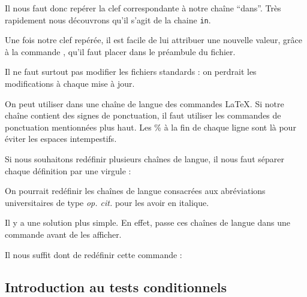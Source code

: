     Il nous faut donc repérer la clef correspondante à notre chaîne \enquote{dans}. Très rapidement nous découvrons qu'il s'agit de la chaine \verb|in|.
    
    Une fois  notre clef repérée, il est facile de lui attribuer une nouvelle valeur, grâce à la commande , qu'il faut placer dans le préambule du fichier.
    
    \begin{attention}
    Il ne faut surtout pas modifier les fichiers standards : on perdrait les modifications à chaque mise à jour.
    \end{attention}
    
    \begin{latexcode}
    \end{latexcode}

    
    On peut utiliser dans une chaîne de langue des commandes \LaTeX. Si notre chaîne contient des signes de ponctuation, il faut utiliser les commandes de ponctuation mentionnées plus haut. Les \% à la fin de chaque ligne sont là pour éviter les espaces intempestifs.
    
    Si nous souhaitons redéfinir plusieurs chaînes de langue, il nous faut séparer chaque définition par une virgule :
    
    \begin{latexcode}
    \end{latexcode}


\begin{plusloins}
On pourrait redéfinir les chaînes de langue consacrées aux abréviations universitaires de type \emph{op. cit.} pour les avoir en italique. 

Il y a une solution plus simple\label{mkibid}. En effet,  passe ces chaînes de langue dans une commande  avant de les afficher.

Il nous suffit dont de redéfinir cette commande :

\begin{latexcode}
\renewcommand{\mkibid}[1]{\emph{#1}}
\end{latexcode}

\end{plusloins}

\subsection{Introduction au tests conditionnels}\label{opcit}

